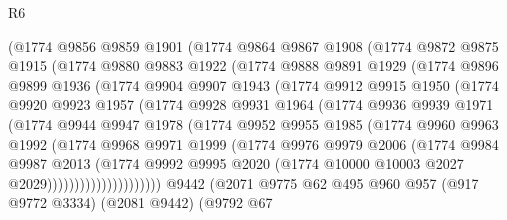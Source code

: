 \begin{lexlean}{R6}
\begin{coremodule}
        (@1774
          @9856
          @9859
          @1901
          (@1774
            @9864
            @9867
            @1908
            (@1774
              @9872
              @9875
              @1915
              (@1774
                @9880
                @9883
                @1922
                (@1774
                  @9888
                  @9891
                  @1929
                  (@1774
                    @9896
                    @9899
                    @1936
                    (@1774
                      @9904
                      @9907
                      @1943
                      (@1774
                        @9912
                        @9915
                        @1950
                        (@1774
                          @9920
                          @9923
                          @1957
                          (@1774
                            @9928
                            @9931
                            @1964
                            (@1774
                              @9936
                              @9939
                              @1971
                              (@1774
                                @9944
                                @9947
                                @1978
                                (@1774
                                  @9952
                                  @9955
                                  @1985
                                  (@1774
                                    @9960
                                    @9963
                                    @1992
                                    (@1774
                                      @9968
                                      @9971
                                      @1999
                                      (@1774
                                        @9976
                                        @9979
                                        @2006
                                        (@1774
                                          @9984
                                          @9987
                                          @2013
                                          (@1774
                                            @9992
                                            @9995
                                            @2020
                                            (@1774 @10000 @10003 @2027 @2029)))))))))))))))))))))
    @9442
    (@2071
      @9775
      @62
      @495
      @960
      @957
      (@917 @9772 @3334)
      (@2081 @9442)
      (@9792
        @67

\end{coremodule}
\end{lexlean}
